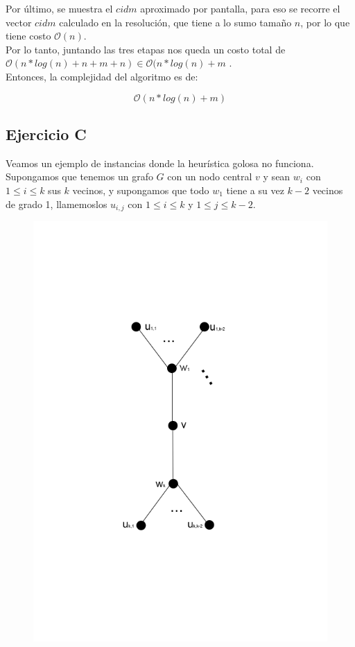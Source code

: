 Por último, se muestra el $cidm$ aproximado por pantalla, para eso se recorre el vector $cidm$ calculado en la resolución, que tiene a lo sumo tamaño $n$, por lo que tiene costo $\mathcal{O}(n)$. \\ 

Por lo tanto, juntando las tres etapas nos queda un costo total de  $\mathcal{O}(n*log(n) + n + m + n) \in \mathcal{O}(n*log(n) + m $ . \\ 

Entonces, la complejidad del algoritmo es de:

$$ \mathcal{O}(n*log(n) + m)$$

\subsection{Ejercicio C}

Veamos un ejemplo de instancias donde la heurística golosa no funciona. Supongamos que tenemos un grafo $G$ con un nodo central $v$ y sean $w_i$ con $1 \leq i \leq k$ sus $k$ vecinos, y supongamos que todo $w_1$ tiene a su vez $k-2$ vecinos de grado 1, llamemoslos $u_{i,j}$ con $1 \leq i \leq k$ y $1 \leq j \leq k-2$. \\ 

\begin{figure}[h]
\begin{center}
\includegraphics[scale=0.5]{imagenes/grafos-ej3-tp3-1.png}
\end{center}
\end{figure}


